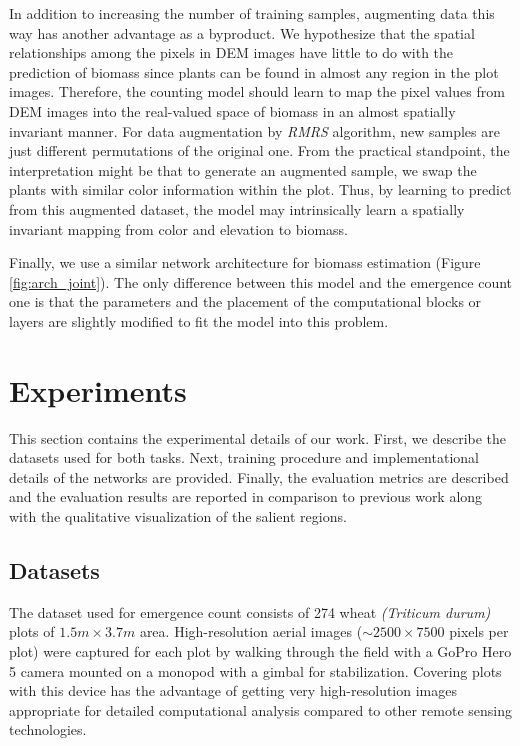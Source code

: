 \documentclass[10pt,twocolumn,letterpaper]{article}
\begin{document}
In addition to increasing the number of training samples, augmenting data this way has another advantage as a byproduct. We hypothesize that the spatial relationships among the pixels in DEM images have little to do with the prediction of biomass since plants can be found in almost any region in the plot images. Therefore, the counting model should learn to map the pixel values from DEM images into the real-valued space of biomass in an almost spatially invariant manner. For data augmentation by \textit{RMRS} algorithm, new samples are just different permutations of the original one. From the practical standpoint, the interpretation might be that to generate an augmented sample, we swap the plants with similar color information within the plot. Thus, by learning to predict from this augmented dataset, the model may intrinsically learn a spatially invariant mapping from color and elevation to biomass.


Finally, we use a similar network architecture for biomass estimation (Figure \ref{fig:arch_joint}). The only difference between this model and the emergence count one is that the parameters and the placement of the computational blocks or layers are slightly modified to fit the model into this problem.

\section{Experiments}
\label{sec:experiments}

This section contains the experimental details of our work. First, we describe the datasets used for both tasks. Next, training procedure and implementational details of the networks are provided. Finally, the evaluation metrics are described and the evaluation results are reported in comparison to previous work along with the qualitative visualization of the salient regions.

\subsection{Datasets}
\label{sec:datasets}
The dataset used for emergence count consists of 274 wheat \textit{(Triticum durum)} plots of $1.5m\times3.7m$ area. High-resolution aerial images ($\sim2500\times7500$ pixels per plot) were captured for each plot by walking through the field with a GoPro Hero 5 camera \cite{gopro} mounted on a monopod with a gimbal for stabilization. Covering plots with this device has the advantage of getting very high-resolution images appropriate for detailed computational analysis compared to other remote sensing technologies.
\end{document}
